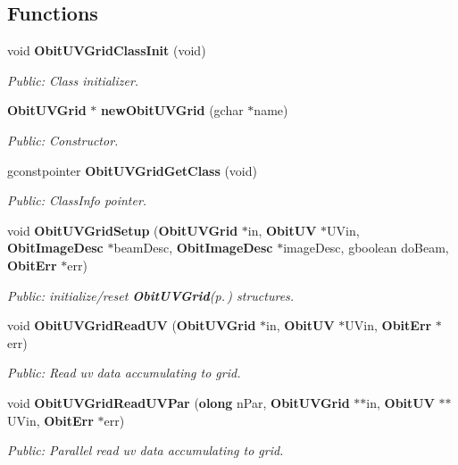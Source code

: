 \subsection*{Functions}
\begin{CompactItemize}
\item 
void {\bf Obit\-UVGrid\-Class\-Init} (void)
\begin{CompactList}\small\item\em Public: Class initializer. \item\end{CompactList}\item 
{\bf Obit\-UVGrid} $\ast$ {\bf new\-Obit\-UVGrid} (gchar $\ast$name)
\begin{CompactList}\small\item\em Public: Constructor. \item\end{CompactList}\item 
gconstpointer {\bf Obit\-UVGrid\-Get\-Class} (void)
\begin{CompactList}\small\item\em Public: Class\-Info pointer. \item\end{CompactList}\item 
void {\bf Obit\-UVGrid\-Setup} ({\bf Obit\-UVGrid} $\ast$in, {\bf Obit\-UV} $\ast$UVin, {\bf Obit\-Image\-Desc} $\ast$beam\-Desc, {\bf Obit\-Image\-Desc} $\ast$image\-Desc, gboolean do\-Beam, {\bf Obit\-Err} $\ast$err)
\begin{CompactList}\small\item\em Public: initialize/reset {\bf Obit\-UVGrid}{\rm (p.\,\pageref{structObitUVGrid})} structures. \item\end{CompactList}\item 
void {\bf Obit\-UVGrid\-Read\-UV} ({\bf Obit\-UVGrid} $\ast$in, {\bf Obit\-UV} $\ast$UVin, {\bf Obit\-Err} $\ast$err)
\begin{CompactList}\small\item\em Public: Read uv data accumulating to grid. \item\end{CompactList}\item 
void {\bf Obit\-UVGrid\-Read\-UVPar} ({\bf olong} n\-Par, {\bf Obit\-UVGrid} $\ast$$\ast$in, {\bf Obit\-UV} $\ast$$\ast$UVin, {\bf Obit\-Err} $\ast$err)
\begin{CompactList}\small\item\em Public: Parallel read uv data accumulating to grid. \item\end{CompactList}\item 

\end{CompactItemize}
